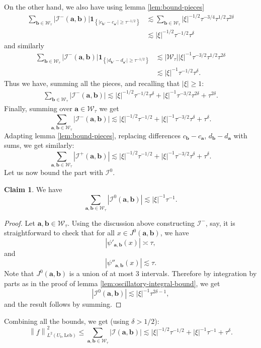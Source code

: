 \documentclass[12pt]{amsart}
\newcommand*\abs[1]{
	\left|#1\right|
}
\newcommand*\Leb{
	\mathrm{Leb}
}
\newcommand{\norm}[1]{\left\lVert#1\right\rVert}
\theoremstyle{definition}
\newtheorem{claim}{Claim}
\renewcommand{\leq}{\leqslant}
\renewcommand{\geq}{\geqslant}
\begin{document}
On the other hand, we also have using lemma \ref{lem:bound-pieces}
\begin{align*}
\sum_{\mathbf{b} \in \mathcal{W}_\tau} \abs{\mathcal{I}^{-}(\mathbf{a}, \mathbf{b})}\mathbf{1}_{\left\{\abs{c_{\mathbf{b}'} - c_{\mathbf{a}'}} \geq \tau^{-1/2}\right\}}
&\lesssim \sum_{\mathbf{b} \in \mathcal{W}_\tau} \abs{\xi}^{-1/2}\tau^{-3/4}\tau^{1/2}\tau^{2\delta}\\
&\lesssim \abs{\xi}^{-1/2}\tau^{-1/2}\tau^{\delta}
\end{align*}
and similarly
\begin{align*}
\sum_{\mathbf{b} \in \mathcal{W}_\tau} \abs{\mathcal{I}^{-}(\mathbf{a}, \mathbf{b})}\mathbf{1}_{\left\{\abs{d_{\mathbf{b}'} - d_{\mathbf{a}'}} \geq \tau^{-1/2}\right\}}
&\lesssim \abs{\mathcal{W}_\tau} \abs{\xi}^{-1}\tau^{-3/2}\tau^{1/2}\tau^{2\delta}\\
&\lesssim \abs{\xi}^{-1}\tau^{-1/2}\tau^{\delta}.
\end{align*}
Thus we have, summing all the pieces, and recalling that $\abs{\xi} \geq 1$:
\begin{align*}
\sum_{\mathbf{b}\in\mathcal{W}_\tau} \abs{\mathcal{I}^{-}(\mathbf{a}, \mathbf{b})} \lesssim \abs{\xi}^{-1/2}\tau^{-1/2}\tau^{\delta} + \abs{\xi}^{-1}\tau^{-3/2}\tau^{2\delta} + \tau^{2\delta}.
\end{align*}
Finally, summing over $\mathbf{a} \in \mathcal{W}_\tau$ we get
\[
\sum_{\mathbf{a},\mathbf{b}\in\mathcal{W}_\tau} \abs{\mathcal{I}^{-}(\mathbf{a}, \mathbf{b})} \lesssim \abs{\xi}^{-1/2}\tau^{-1/2} + \abs{\xi}^{-1}\tau^{-3/2}\tau^{\delta} + \tau^{\delta}.
\]
Adapting lemma \ref{lem:bound-pieces}, replacing differences $c_\mathbf{b} - c_\mathbf{a}$, $d_\mathbf{b} - d_\mathbf{a}$ with sums, we get similarly:
\[
\sum_{\mathbf{a},\mathbf{b}\in\mathcal{W}_\tau} \abs{\mathcal{I}^{+}(\mathbf{a}, \mathbf{b})} \lesssim \abs{\xi}^{-1/2}\tau^{-1/2} + \abs{\xi}^{-1}\tau^{-3/2}\tau^{\delta} + \tau^{\delta}.
\]
Let us now bound the part with $\mathcal{I}^0$.
\begin{claim}We have
\[\sum_{\mathbf{a},\mathbf{b}\in\mathcal{W}_\tau} \abs{\mathcal{I}^0(\mathbf{a},\mathbf{b})} \lesssim \abs{\xi}^{-1}\tau^{-1}.\]
\end{claim}
\begin{proof}
Let $\mathbf{a},\mathbf{b}\in\mathcal{W}_\tau$. Using the discussion above constructing $\mathcal{I}^-$, say, it is straightforward to check that for all $x \in J^0(\mathbf{a},\mathbf{b})$, we have
\[\abs{\psi'_{\mathbf{a},\mathbf{b}}(x)} \asymp \tau,\]
and
\[\abs{\psi''_{\mathbf{a},\mathbf{b}}(x)} \lesssim \tau.\]
Note that $J^0(\mathbf{a},\mathbf{b})$ is a union of at most 3 intervals. Therefore by integration by parts as in the proof of lemma \ref{lem:oscillatory-integral-bound}, we get
\[\abs{\mathcal{I}^0(\mathbf{a},\mathbf{b})} \lesssim \abs{\xi}^{-1}\tau^{2\delta - 1},\]
and the result follows by summing.
\end{proof}
Combining all the bounds, we get (using $\delta > 1/2$):
\[
\norm{f}_{L^2(U_b, \Leb)}^2 \leq \sum_{\mathbf{a},\mathbf{b}\in\mathcal{W}_\tau} \abs{\mathcal{I}(\mathbf{a}, \mathbf{b})} \lesssim \abs{\xi}^{-1/2}\tau^{-1/2} + \abs{\xi}^{-1}\tau^{-1} + \tau^{\delta}.
\]
\end{document}
